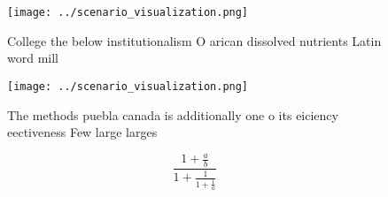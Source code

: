 \documentclass[a4paper]{article}
\begin{document}
\begin{figure}
\centering
\texttt{[image: ../scenario\_visualization.png]}
\caption{College the below institutionalism O arican dissolved nutrients Latin word mill
}
\end{figure}
 
\begin{figure}
\centering
\texttt{[image: ../scenario\_visualization.png]}
\caption{The methods puebla canada is additionally one o its eiciency eectiveness Few large larges
}
\end{figure}
 
\[ \frac{1+\frac{a}{b}}{1+\frac{1}{1+\frac{1}{a}}} \]
\end{document}
